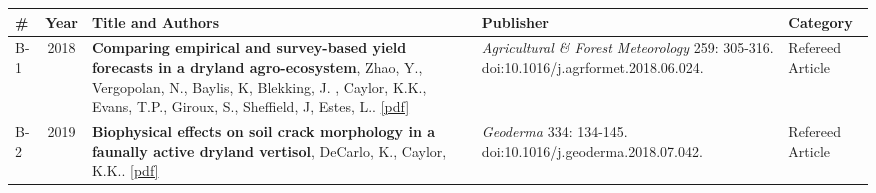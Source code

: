 
\begin{longtable}{lcp{7.75cm}>{\raggedright}p{5.25cm}p{1.75cm}}
\# & Year & Title and Authors & Publisher & Category\\
\hline 
\endhead 
B-1 & 2018 & {\bf Comparing empirical and survey-based yield forecasts in a dryland agro-ecosystem}, Zhao, Y., Vergopolan, N., Baylis, K, Blekking, J. , Caylor, K.K., Evans, T.P., Giroux, S., Sheffield, J, Estes, L.. \href{https://ucsb.box.com/s/a8k851rd3sw2ec374ra98ixxbc34bopn}{[pdf]} & \emph{ Agricultural \& Forest Meteorology } 259: 305-316. doi:10.1016/j.agrformet.2018.06.024.  & Refereed Article\\
B-2 & 2019 & {\bf Biophysical effects on soil crack morphology in a faunally active dryland vertisol}, DeCarlo, K., Caylor, K.K.. \href{https://ucsb.box.com/s/o7utttzbt5dt04rgopi7l5yhkqepw5bz}{[pdf]} & \emph{ Geoderma } 334: 134-145. doi:10.1016/j.geoderma.2018.07.042.  & Refereed Article\\
\end{longtable}

